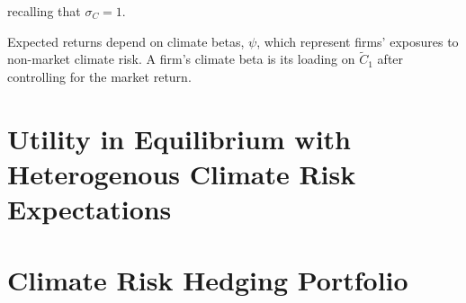 recalling that $\sigma_C = 1$.

Expected returns depend on climate betas, $\psi$, which represent 
firms' exposures to non-market climate risk. A firm's climate 
beta is its loading on $\tilde{C}_1$ after controlling for the market return. 


\section{Utility in Equilibrium with Heterogenous 
Climate Risk Expectations}

\section{Climate Risk Hedging Portfolio}
